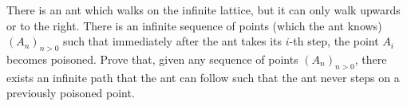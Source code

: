There is an ant which walks on the infinite lattice, but it can only walk upwards or to the right. There is an infinite sequence of points (which the ant knows) $(A_n)_{n > 0}$ such that immediately after the ant takes its $i$-th step, the point $A_i$ becomes poisoned. Prove that, given any sequence of points $(A_n)_{n > 0}$, there exists an infinite path that the ant can follow such that the ant never steps on a previously poisoned point.
